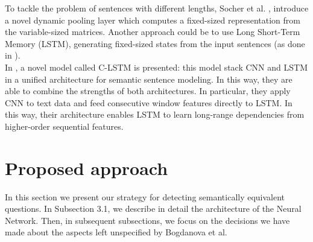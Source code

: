 \documentclass[10pt,twocolumn,letterpaper]{article}
\begin{document}
To tackle the problem of sentences with different lengths, Socher et al. \cite{socher2011dynamic}, introduce a novel dynamic pooling layer which computes a fixed-sized representation from the variable-sized matrices. Another approach could be to use Long Short-Term Memory (LSTM), generating fixed-sized states from the input sentences (as done in \cite{tai2015improved}).\\
In \cite{zhou2015c}, a novel model called C-LSTM is presented: this model stack CNN and LSTM in a unified architecture for semantic sentence modeling. In this way, they are able to combine the strengths of both architectures. In particular, they apply CNN to text data and feed consecutive window features directly to LSTM. In this way, their architecture enables LSTM to learn long-range dependencies from higher-order sequential features.
\section{Proposed approach}
In this section we present our strategy for detecting semantically equivalent questions. In Subsection 3.1, we describe in detail the architecture of the Neural Network. Then, in subsequent subsections, we focus on the decisions we have made about the aspects left unspecified by Bogdanova et al.
\end{document}
